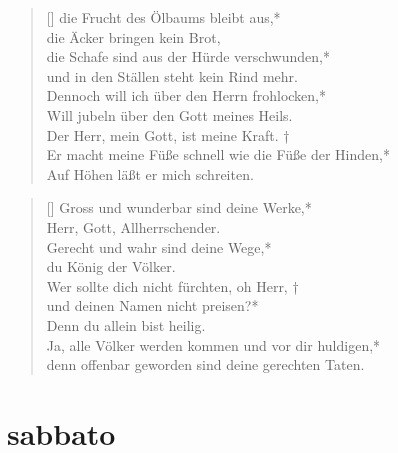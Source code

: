 \begin{verse}[\versewidth]
\vin die Frucht des Ölbaums bleibt aus,*\\
\vin die Äcker bringen kein Brot,\\
die Schafe sind aus der Hürde verschwunden,*\\
und in den Ställen steht kein Rind mehr.\\ 
\vin Dennoch will ich über den Herrn frohlocken,*\\
\vin Will jubeln über den Gott meines Heils.\\
Der Herr, mein Gott, ist meine Kraft. †\\
Er macht meine Füße schnell wie die Füße der Hinden,*\\
Auf Höhen läßt er mich schreiten.\\
\end{verse}




\vspace{0.6cm}

\begin{verse}[\versewidth]
Gross und wunderbar sind deine Werke,*\\
Herr, Gott, Allherrschender.\\
\vin Gerecht und wahr sind deine Wege,*\\
\vin du König der Völker.\\
Wer sollte dich nicht fürchten, oh Herr, †\\
und deinen Namen nicht preisen?*\\
Denn du allein bist heilig.\\
\vin Ja, alle Völker werden kommen und vor dir huldigen,*\\
\vin denn offenbar geworden sind deine gerechten Taten.\\
\end{verse}

\section{sabbato}

